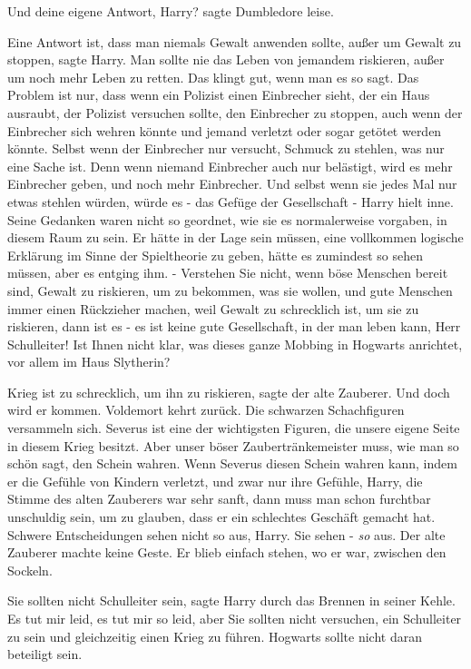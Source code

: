 \glqq{}Und deine eigene Antwort, Harry?\grqq{} sagte Dumbledore leise.

\glqq{}Eine Antwort ist, dass man niemals Gewalt anwenden sollte, außer um Gewalt
zu stoppen\grqq{}, sagte Harry. \glqq{}Man sollte nie das Leben von jemandem
riskieren, außer um noch mehr Leben zu retten. Das klingt gut, wenn man es so
sagt. Das Problem ist nur, dass wenn ein Polizist einen Einbrecher sieht, der
ein Haus ausraubt, der Polizist versuchen sollte, den Einbrecher zu stoppen,
auch wenn der Einbrecher sich wehren könnte und jemand verletzt oder sogar
getötet werden könnte. Selbst wenn der Einbrecher nur versucht, Schmuck zu
stehlen, was nur eine Sache ist. Denn wenn niemand Einbrecher auch nur
belästigt, wird es mehr Einbrecher geben, und noch mehr Einbrecher. Und selbst
wenn sie jedes Mal nur etwas stehlen würden, würde es - das Gefüge der
Gesellschaft -\grqq{} Harry hielt inne. Seine Gedanken waren nicht so geordnet,
wie sie es normalerweise vorgaben, in diesem Raum zu sein. Er hätte in der Lage
sein müssen, eine vollkommen logische Erklärung im Sinne der Spieltheorie zu
geben, hätte es zumindest so sehen müssen, aber es entging ihm. - \glqq{}
Verstehen Sie nicht, wenn böse Menschen bereit sind, Gewalt zu riskieren, um zu
bekommen, was sie wollen, und gute Menschen immer einen Rückzieher machen, weil
Gewalt zu schrecklich ist, um sie zu riskieren, dann ist es - es ist keine gute
Gesellschaft, in der man leben kann, Herr Schulleiter! Ist Ihnen nicht klar, was
dieses ganze Mobbing in Hogwarts anrichtet, vor allem im Haus Slytherin?\grqq{}

\glqq{}Krieg ist zu schrecklich, um ihn zu riskieren\grqq{}, sagte der alte
Zauberer. \glqq{}Und doch wird er kommen. Voldemort kehrt zurück. Die schwarzen
Schachfiguren versammeln sich. Severus ist eine der wichtigsten Figuren, die
unsere eigene Seite in diesem Krieg besitzt. Aber unser böser
Zaubertränkemeister muss, wie man so schön sagt, den Schein wahren. Wenn Severus
diesen Schein wahren kann, indem er die Gefühle von Kindern verletzt, und zwar
nur ihre Gefühle, Harry\grqq{}, die Stimme des alten Zauberers war sehr sanft,
\glqq{}dann muss man schon furchtbar unschuldig sein, um zu glauben, dass er ein
schlechtes Geschäft gemacht hat. Schwere Entscheidungen sehen nicht so aus,
Harry. Sie sehen - \emph{so} aus.\grqq{} Der alte Zauberer machte keine Geste.
Er blieb einfach stehen, wo er war, zwischen den Sockeln.

\glqq{}Sie sollten nicht Schulleiter sein\grqq{}, sagte Harry durch das Brennen
in seiner Kehle. \glqq{}Es tut mir leid, es tut mir so leid, aber Sie sollten
nicht versuchen, ein Schulleiter zu sein und gleichzeitig einen Krieg zu führen.
Hogwarts sollte nicht daran beteiligt sein.\grqq{}

